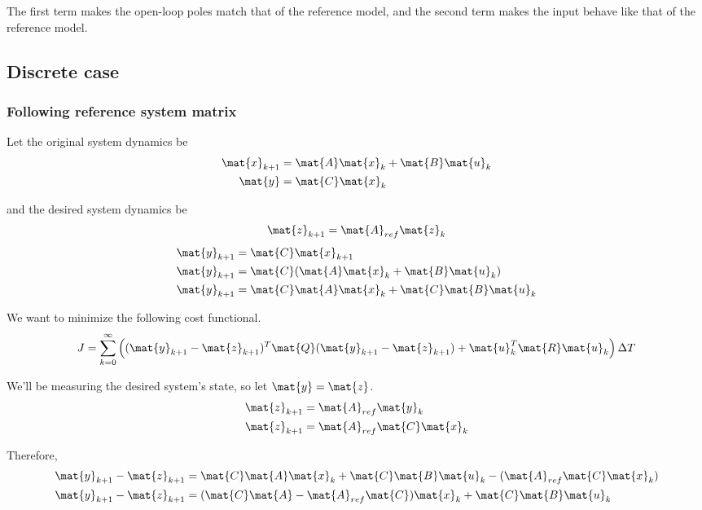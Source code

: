 The first term makes the open-loop poles match that of the reference model, and
the second term makes the input behave like that of the reference model.

\subsection{Discrete case}

\subsubsection{Following reference system matrix}

Let the original system dynamics be
\begin{align*}
  \mat{x}_{k+1} &= \mat{A}\mat{x}_k + \mat{B}\mat{u}_k \\
  \mat{y} &= \mat{C}\mat{x}_k
\end{align*}

and the desired system dynamics be
\begin{equation*}
  \mat{z}_{k+1} = \mat{A}_{ref}\mat{z}_k
\end{equation*}
\begin{align*}
  \mat{y}_{k+1} &= \mat{C}\mat{x}_{k+1} \\
  \mat{y}_{k+1} &= \mat{C}(\mat{A}\mat{x}_k + \mat{B}\mat{u}_k) \\
  \mat{y}_{k+1} &= \mat{C}\mat{A}\mat{x}_k + \mat{C}\mat{B}\mat{u}_k
\end{align*}

We want to minimize the following cost functional.
\begin{equation*}
  J = \sum_{k=0}^\infty \left((\mat{y}_{k+1} - \mat{z}_{k+1})^T \mat{Q}
    (\mat{y}_{k+1} - \mat{z}_{k+1}) + \mat{u}_k^T\mat{R}\mat{u}_k\right)
    \Delta T
\end{equation*}

We'll be measuring the desired system's state, so let $\mat{y} = \mat{z}$.
\begin{align*}
  \mat{z}_{k+1} &= \mat{A}_{ref}\mat{y}_k \\
  \mat{z}_{k+1} &= \mat{A}_{ref}\mat{C}\mat{x}_k
\end{align*}

Therefore,
\begin{align*}
  \mat{y}_{k+1} - \mat{z}_{k+1} &=
    \mat{C}\mat{A}\mat{x}_k + \mat{C}\mat{B}\mat{u}_k -
    (\mat{A}_{ref}\mat{C}\mat{x}_k) \\
  \mat{y}_{k+1} - \mat{z}_{k+1} &=
    (\mat{C}\mat{A} - \mat{A}_{ref}\mat{C})\mat{x}_k + \mat{C}\mat{B}\mat{u}_k
\end{align*}

